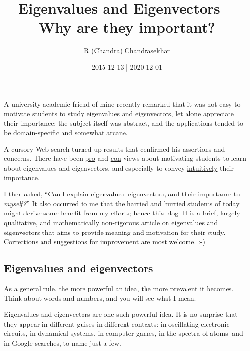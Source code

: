 \documentclass[
  12pt,
  a4paper,
]{article}
\title{Eigenvalues and Eigenvectors---Why are they important?}
\author{R (Chandra) Chandrasekhar}
\date{2015-12-13 | 2020-12-01}
\begin{document}
\maketitle

\thispagestyle{empty}


A university academic friend of mine recently remarked that it was not
easy to motivate students to study
\href{https://en.wikipedia.org/wiki/Eigenvalues_and_eigenvectors}{eigenvalues
and eigenvectors,} let alone appreciate their importance: the subject
itself was abstract, and the applications tended to be domain-specific
and somewhat arcane.

A cursory Web search turned up results that confirmed his assertions and
concerns. There have been
\href{http://matheducators.stackexchange.com/questions/520/what-is-a-good-motivation-showcase-for-a-student-for-the-study-of-eigenvalues}{pro}
and
\href{http://matheducators.stackexchange.com/questions/8586/too-much-motivation}{con}
views about motivating students to learn about eigenvalues and
eigenvectors, and especially to convey
\href{http://matheducators.stackexchange.com/questions/3983/what-is-the-best-way-to-intuitively-explain-what-eigenvectors-and-eigenvalues-ar}{intuitively}
their
\href{http://math.stackexchange.com/questions/23312/what-is-the-importance-of-eigenvalues-eigenvectors}{importance}.

I then asked, ``Can I explain eigenvalues, eigenvectors, and their
importance to \emph{myself?}'' It also occurred to me that the harried
and hurried students of today might derive some benefit from my efforts;
hence this blog. It is a brief, largely qualitative, and mathematically
non-rigorous article on eigenvalues and eigenvectors that aims to
provide meaning and motivation for their study. Corrections and
suggestions for improvement are most welcome. :-)

\hypertarget{eigenvalues-and-eigenvectors}{%
\subsection{Eigenvalues and
eigenvectors}\label{eigenvalues-and-eigenvectors}}

As a general rule, the more powerful an idea, the more prevalent it
becomes. Think about words and numbers, and you will see what I mean.

Eigenvalues and eigenvectors are one such powerful idea. It is no
surprise that they appear in different guises in different contexts: in
oscillating electronic circuits, in dynamical systems, in computer
games, in the spectra of atoms, and in Google searches, to name just a
few.
\end{document}
